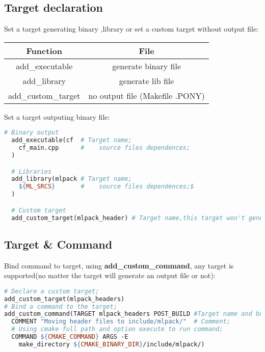 \documentclass[11pt]{article}
\begin{document}
\subsection{Target declaration}%
\label{sub:target_declaration}

Set a target generating binary ,library or set a custom target without output file:

\begin{center}
  \begin{tabular}{|c|c|}
    \hline
     \textbf{Function} & \textbf{File} \\
    \hline
     add\_executable & generate binary file \\
    \hline
     add\_library & generate lib file  \\
    \hline
     add\_custom\_target & no output file (Makefile .PONY) \\
    \hline
  \end{tabular}
\end{center}

Set a target outputing binary file:

\begin{lstlisting}[language=make,label=lst:6lst,caption=Target declaration]
  # Binary output
  add_executable(cf  # Target name;
    cf_main.cpp      #    source files dependences;
  )

  # Libraries
  add_library(mlpack # Target name;
    ${ML_SRCS}       #    source files dependences;$
  )

  # Custom target
  add_custom_target(mlpack_header) # Target name,this target won't generate a file;
\end{lstlisting}


\indent
\subsection{Target \& Command}%
\label{sub:target&command}

Bind command to target, using \textbf{add\_custom\_command}, any target is supported(no matter the target will generate an output file or not):
\begin{lstlisting}[language=make,label=lst:7lst,caption=Target declaration]
# Declare a custom target;
add_custom_target(mlpack_headers)
# Bind a command to the target;
add_custom_command(TARGET mlpack_headers POST_BUILD #Target name and build event;
  COMMENT "Moving header files to include/mlpack/"  # Comment;
  # Using cmake full path and option execute to run command;
  COMMAND ${CMAKE_COMMAND} ARGS -E 
    make_directory ${CMAKE_BINARY_DIR}/include/mlpack/)  

\end{lstlisting}
\end{document}
